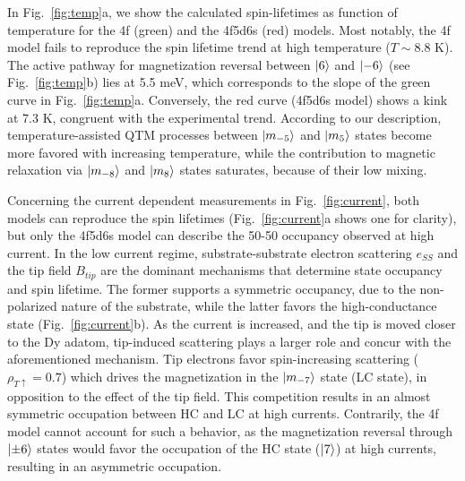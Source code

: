 \documentclass[
reprint,amsmath,amssymb,aps]{revtex4-2}
\begin{document}
In Fig.~\ref{fig:temp}a, we show the calculated spin-lifetimes as function of temperature for the 4f (green) and the 4f5d6s (red) models. Most notably, the 4f model fails to reproduce the spin lifetime trend at high temperature ($T\sim 8.8$ K). The active pathway for magnetization reversal between $\ket{6}$ and $\ket{-6}$ (see Fig.~\ref{fig:temp}b) lies at 5.5 meV, which corresponds to the slope of the green curve in Fig.~\ref{fig:temp}a. Conversely, the red curve (4f5d6s model) shows a kink at 7.3 K, congruent with the experimental trend. According to our description, temperature-assisted QTM processes between $\ket{m_{-5}}$ and $\ket{m_{5}}$ states become more favored with increasing temperature, while the contribution to magnetic relaxation via $\ket{m_{-8}}$ and $\ket{m_{8}}$ states saturates, because of their low mixing.

Concerning the current dependent measurements in Fig.~\ref{fig:current}, both models can reproduce the spin lifetimes (Fig.~\ref{fig:current}a shows one for clarity), but only the 4f5d6s model can describe the 50-50 occupancy observed at high current. In the low current regime, substrate-substrate electron scattering $e_{SS}$ and the tip field $B_{tip}$ are the dominant mechanisms that determine state occupancy and spin lifetime. The former supports a symmetric occupancy, due to the non-polarized nature of the substrate, while the latter favors the high-conductance state (Fig.~\ref{fig:current}b). As the current is increased, and the tip is moved closer to the Dy adatom, tip-induced scattering plays a larger role and concur with the aforementioned mechanism. Tip electrons favor spin-increasing scattering ($\rho_{T \uparrow} = 0.7$) which drives the magnetization in the $\ket{m_{-7}}$ state (LC state), in opposition to the effect of the tip field. This competition results in an almost symmetric occupation between HC and LC at high currents. Contrarily, the 4f model cannot account for such a behavior, as the magnetization reversal through $\ket{\pm 6}$ states would favor the occupation of the HC state ($\ket{7}$) at high currents, resulting in an asymmetric occupation.
\end{document}
